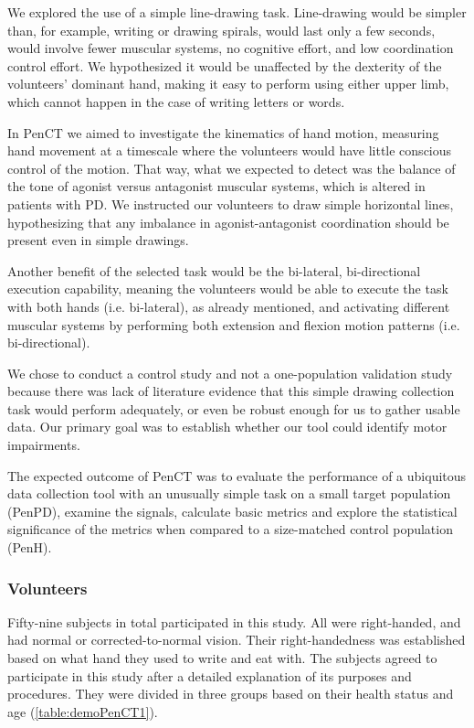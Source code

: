 We explored the use of a simple line-drawing task. Line-drawing would be simpler than, for example, writing or drawing spirals, would last only a few seconds, would involve fewer muscular systems, no cognitive effort, and low coordination control effort. We hypothesized it would be unaffected by the dexterity of the volunteers' dominant hand, making it easy to perform using either upper limb, which cannot happen in the case of writing letters or words. 

In \gls{PenCT} we aimed to investigate the kinematics of hand motion, measuring hand movement at a timescale where the volunteers would have little conscious control of the motion. That way, what we expected to detect was the balance of the tone of agonist versus antagonist muscular systems, which is altered in patients with \gls{PD}. We instructed our volunteers to draw simple horizontal lines, hypothesizing that any imbalance in agonist-antagonist coordination should be present even in simple drawings.

Another benefit of the selected task would be the bi-lateral, bi-directional execution capability, meaning the volunteers would be able to execute the task with both hands (i.e. bi-lateral), as already mentioned, and activating different muscular systems by performing both extension and flexion motion patterns (i.e. bi-directional). 

We chose to conduct a control study and not a one-population validation study because there was lack of literature evidence that this simple drawing collection task would perform adequately, or even be robust enough for us to gather usable data. Our primary goal was to establish whether our tool could identify motor impairments. 

The expected outcome of \gls{PenCT} was to evaluate the performance of a ubiquitous data collection tool with an unusually simple task on a small target population (\gls{PenPD}), examine the signals, calculate basic metrics and explore the statistical significance of the metrics when compared to a size-matched control population (\gls{PenH}). 


\subsubsection{Volunteers}
\label{subsubsec:PenCTVolunteers}


Fifty-nine subjects in total participated in this study. All were right-handed, and had normal or corrected-to-normal vision. Their right-handedness was established based on what hand they used to write and eat with. The subjects agreed to participate in this study after a detailed explanation of its purposes and procedures. They were divided in three groups based on their health status and age (\ref{table:demoPenCT1}). 

